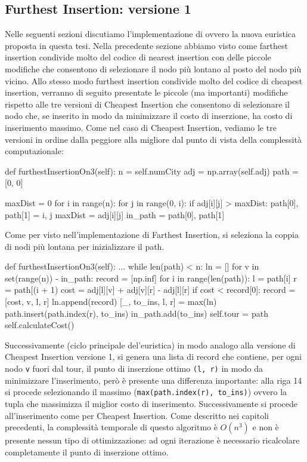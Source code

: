 \documentclass[a4paper,12pt]{report}
\begin{document}
\subsection{Furthest Insertion: versione 1}
Nelle seguenti sezioni discutiamo l'implementazione di  ovvero la nuova euristica proposta in questa tesi. Nella precedente sezione abbiamo visto come farthest insertion condivide molto del codice di nearest insertion con delle piccole modifiche che consentono di selezionare il nodo più lontano al posto del nodo più vicino. Allo stesso modo furthest insertion condivide molto del codice di cheapest insertion, verranno di seguito presentate le piccole (ma importanti) modifiche rispetto alle tre versioni di Cheapest Insertion che consentono di selezionare il nodo che, se inserito in modo da minimizzare il costo di inserzione, ha costo di inserimento massimo. Come nel caso di Cheapest Insertion, vediamo le tre versioni in ordine dalla peggiore alla migliore dal punto di vista della complessità computazionale:
\begin{python}
def furthestInsertionOn3(self):
  n = self.numCity
  adj = np.array(self.adj)
  path = [0, 0]

  maxDist = 0
  for i in range(n):
    for j in range(0, i):
      if adj[i][j] > maxDist:
          path[0], path[1] = i, j
          maxDist = adj[i][j]
  in_path = {path[0], path[1]}
\end{python}
Come per visto nell'implementazione di Farthest Insertion, si seleziona la coppia di nodi più lontana per inizializzare il path. 
\begin{python}
def furthestInsertionOn3(self):
  ...
  while len(path) < n:
    ln = []
    for v in set(range(n)) - in_path:
      record = [np.inf]
      for i in range(len(path)):
        l = path[i]
        r = path[(i + 1) %
        cost = adj[l][v] + adj[v][r] - adj[l][r]
        if cost < record[0]:
          record = [cost, v, l, r]
      ln.append(record)
    [_, to_ins, l, r] = max(ln)
    path.insert(path.index(r), to_ins)
    in_path.add(to_ins)                
  self.tour = path
  self.calculateCost()
\end{python}
Successivamente (ciclo principale del'euristica) in modo analogo alla versione di Cheapest Insertion versione 1, si genera una lista di record che contiene, per ogni nodo \lstinline|v| fuori dal tour, il punto di inserzione ottimo \lstinline!(l, r)! in modo da minimizzare l'inserimento, però è presente una differenza importante: alla riga 14 si procede selezionando il massimo (\lstinline!max(path.index(r), to_ins)!) ovvero la tupla che massimizza il miglior costo di inserimento. Successivamente si procede all'inserimento come per Cheapest Insertion. \newline
Come descritto nei capitoli precedenti, la complessità temporale di questo algoritmo è $O(n^3)$ e non è presente nessun tipo di ottimizzazione: ad ogni iterazione è necessario ricalcolare completamente il punto di inserzione ottimo.
\end{document}
